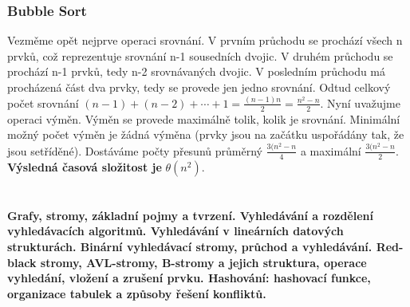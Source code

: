 \documentclass[10pt,a4paper]{article}
\begin{document}
\subsubsection{Bubble Sort}
Vezměme opět nejprve operaci srovnání. V prvním průchodu se prochází všech n prvků, což reprezentuje srovnání n-1 sousedních dvojic. V druhém průchodu se prochází n-1 prvků, tedy n-2 srovnávaných dvojic. V posledním průchodu má procházená část dva prvky, tedy se provede jen jedno srovnání. Odtud celkový počet srovnání $(n-1) + (n-2) + \cdots + 1 = \frac{(n-1)n}{2} = \frac{n^2-n}{2}$. Nyní uvažujme operaci výměn. Výměn se provede maximálně tolik, kolik je srovnání. Minimální možný počet výměn je žádná výměna (prvky jsou na začátku uspořádány tak, že jsou setříděné). Dostáváme počty přesunů průměrný $\frac{3(n^2-n}{4}$ a maximální $\frac{3(n^2-n}{2}$. \textbf{Výsledná časová složitost je} $\theta (n^2)$.



\newpage

\section{}
\paragraph{Grafy, stromy, základní pojmy a tvrzení. Vyhledávání a rozdělení vyhledávacích algoritmů. Vyhledávání v lineárních datových strukturách. Binární vyhledávací stromy, průchod a vyhledávání. Red-black stromy, AVL-stromy, B-stromy a jejich struktura, operace vyhledání, vložení a zrušení prvku. Hashování: hashovací funkce, organizace tabulek a způsoby řešení konfliktů.}
\end{document}
